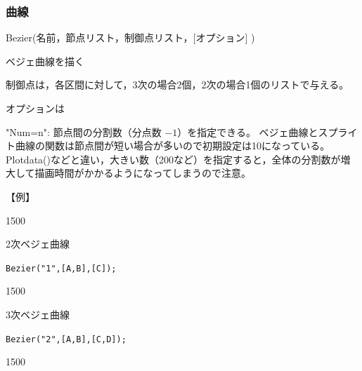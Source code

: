 \documentclass[papersize,a4paper,12pt,uplatex]{jsarticle}
\begin{document}
\subsubsection{曲線}
\begin{description}

\hypertarget{bezier}{}
\item[関数]Bezier(名前，節点リスト，制御点リスト，[オプション] )
\item[機能]ベジェ曲線を描く
\item[説明]制御点は，各区間に対して，3次の場合2個，2次の場合1個のリストで与える。

オプションは

"Num=n": 節点間の分割数（分点数 $-1$）を指定できる。 ベジェ曲線とスプライト曲線の関数は節点間が短い場合が多いので初期設定は10になっている。Plotdata()などと違い，大きい数（200など）を指定すると，全体の分割数が増大して描画時間がかかるようになってしまうので注意。

\vspace{\baselineskip}
【例】

\begin{layer}{150}{0}
\end{layer}

2次ベジェ曲線

\verb|Bezier("1",[A,B],[C]);|

\vspace{20mm}

\begin{layer}{150}{0}
\end{layer}

3次ベジェ曲線

\verb|Bezier("2",[A,B],[C,D]);|

\vspace{20mm}

\begin{layer}{150}{0}
\end{layer}






\end{description}
\end{document}

